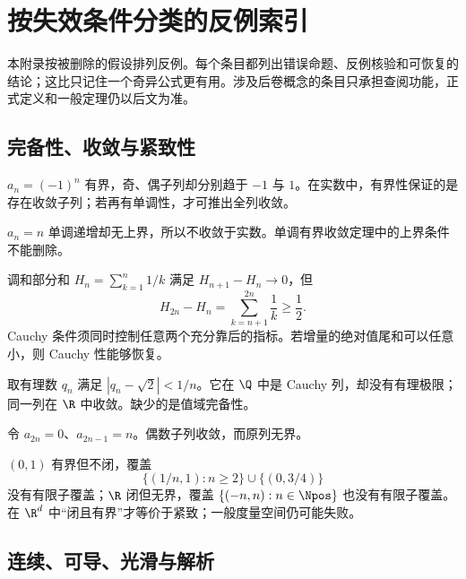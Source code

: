 \chapter{按失效条件分类的反例索引}
\label{app:counterexample-index}
\label{chap:appendix-counterexamples}

\begin{chapterguide}
本附录按被删除的假设排列反例。每个条目都列出错误命题、反例核验和可恢复的结论；这比只记住一个奇异公式更有用。涉及后卷概念的条目只承担查阅功能，正式定义和一般定理仍以后文为准。
\end{chapterguide}

\section{完备性、收敛与紧致性}

\begin{description}[style=nextline,leftmargin=2.8em]
 \item[有界不推出收敛]
 \(a_n=(-1)^n\) 有界，奇、偶子列却分别趋于 \(-1\) 与 \(1\)。在实数中，有界性保证的是存在收敛子列；若再有单调性，才可推出全列收敛。

 \item[单调不推出有限极限]
 \(a_n=n\) 单调递增却无上界，所以不收敛于实数。单调有界收敛定理中的上界条件不能删除。

 \item[相邻差趋零不推出 Cauchy]
 调和部分和 \(H_n=\sum_{k=1}^n1/k\) 满足 \(H_{n+1}-H_n\to0\)，但
 \[
  H_{2n}-H_n=\sum_{k=n+1}^{2n}\frac1k\ge\frac12.
 \]
 Cauchy 条件须同时控制任意两个充分靠后的指标。若增量的绝对值尾和可以任意小，则 Cauchy 性能够恢复。

 \item[Cauchy 不推出在原空间中有极限]
 取有理数 \(q_n\) 满足 \(|q_n-\sqrt2|<1/n\)。它在 \(\Q\) 中是 Cauchy 列，却没有有理极限；同一列在 \(\R\) 中收敛。缺少的是值域完备性。

 \item[有收敛子列不推出有界]
 令 \(a_{2n}=0\)、\(a_{2n-1}=n\)。偶数子列收敛，而原列无界。

 \item[闭或有界单独都不推出紧致]
 \((0,1)\) 有界但不闭，覆盖
 \[
  \{(1/n,1):n\ge2\}\cup\{(0,3/4)\}
 \]
 没有有限子覆盖；\(\R\) 闭但无界，覆盖 \(\{(-n,n):n\in\Npos\}\) 也没有有限子覆盖。在 \(\R^d\) 中“闭且有界”才等价于紧致；一般度量空间仍可能失败。
\end{description}

\section{连续、可导、光滑与解析}

